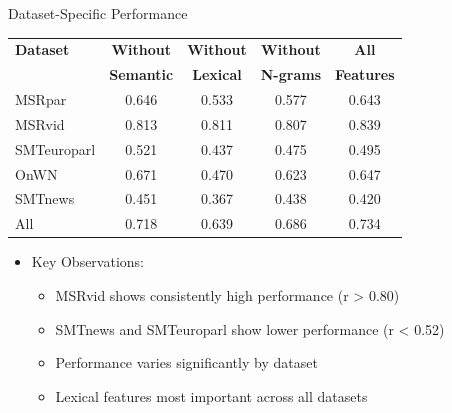\documentclass{beamer}
\begin{document}
\begin{frame}{Dataset-Specific Performance}
    \begin{center}
        \begin{tabular}{|l|c|c|c|c|}
            \hline
            \textbf{Dataset} & \textbf{Without} & \textbf{Without} & \textbf{Without} & \textbf{All} \\
            & \textbf{Semantic} & \textbf{Lexical} & \textbf{N-grams} & \textbf{Features} \\
            \hline
            MSRpar & 0.646 & 0.533 & 0.577 & 0.643 \\
            MSRvid & 0.813 & 0.811 & 0.807 & 0.839 \\
            SMTeuroparl & 0.521 & 0.437 & 0.475 & 0.495 \\
            OnWN & 0.671 & 0.470 & 0.623 & 0.647 \\
            SMTnews & 0.451 & 0.367 & 0.438 & 0.420 \\
            \hline
            All & 0.718 & 0.639 & 0.686 & 0.734 \\
            \hline
        \end{tabular}
    \end{center}
    \begin{itemize}
        \item Key Observations:
        \begin{itemize}
            \item MSRvid shows consistently high performance (r \textgreater{} 0.80)
            \item SMTnews and SMTeuroparl show lower performance (r \textless{} 0.52)
            \item Performance varies significantly by dataset
            \item Lexical features most important across all datasets
        \end{itemize}
    \end{itemize}
\end{frame}

\end{document}
